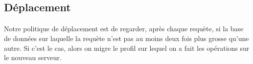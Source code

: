 \subsection{Déplacement}

\paragraph{}
Notre politique de déplacement est de regarder, après chaque requète, si la base de données sur laquelle la requète n'est pas au moins deux fois plus grosse qu'une autre. Si c'est le cas, alors on migre le profil sur lequel on a fait les opérations sur le nouveau serveur.
